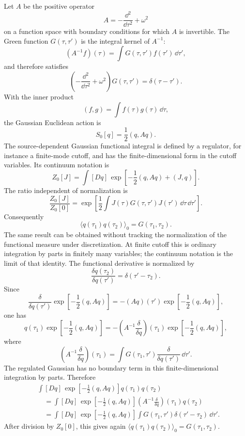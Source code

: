 Let \(A\) be the positive operator
\[
  A=-\frac{\dd^2}{\dd\tau^2}+\omega^2
\]
on a function space with boundary conditions for which \(A\) is invertible.
The Green function \(G(\tau,\tau')\) is the integral kernel of \(A^{-1}\):
\[
  (A^{-1}f)(\tau)
  =
  \int G(\tau,\tau')f(\tau')\,\dd\tau',
\]
and therefore satisfies
\[
  \left(
    -\frac{\dd^2}{\dd\tau^2}+\omega^2
  \right)G(\tau,\tau')
  =
  \delta(\tau-\tau').
\]
With the inner product
\[
  (f,g)=\int f(\tau)g(\tau)\,\dd\tau,
\]
the Gaussian Euclidean action is
\[
  S_0[q]=\frac12(q,Aq).
\]
The source-dependent Gaussian functional integral is defined by a regulator,
for instance a finite-mode cutoff, and has the finite-dimensional form in the
cutoff variables. Its continuum notation is
\[
  Z_0[J]
  =
  \int[Dq]\,
  \exp\left[
    -\frac12(q,Aq)+(J,q)
  \right].
\]
The ratio independent of normalization is
\[
  \frac{Z_0[J]}{Z_0[0]}
  =
  \exp\left[
    \frac12\int J(\tau)G(\tau,\tau')J(\tau')\,
    \dd\tau\,\dd\tau'
  \right].
\]
Consequently
\[
  \langle q(\tau_1)q(\tau_2)\rangle_0
  =
  G(\tau_1,\tau_2).
\]
The same result can be obtained without tracking the normalization of the
functional measure under discretization.  At finite cutoff this is ordinary
integration by parts in finitely many variables; the continuum notation is the
limit of that identity.  The functional derivative is normalized by
\[
  \frac{\delta q(\tau_2)}{\delta q(\tau')}=\delta(\tau'-\tau_2).
\]
Since
\[
  \frac{\delta}{\delta q(\tau')}
  \exp\left[-\frac12(q,Aq)\right]
  =
  -(Aq)(\tau')\exp\left[-\frac12(q,Aq)\right],
\]
one has
\[
  q(\tau_1)\exp\left[-\frac12(q,Aq)\right]
  =
  -
  \left(A^{-1}\frac{\delta}{\delta q}\right)(\tau_1)
  \exp\left[-\frac12(q,Aq)\right],
\]
where
\[
  \left(A^{-1}\frac{\delta}{\delta q}\right)(\tau_1)
  =
  \int G(\tau_1,\tau')\frac{\delta}{\delta q(\tau')}\,\dd\tau'.
\]
The regulated Gaussian has no boundary term in this finite-dimensional
integration by parts. Therefore
\[
\begin{aligned}
  &\int[Dq]\,\exp\left[-\frac12(q,Aq)\right]
    q(\tau_1)q(\tau_2)  \\
  &\quad =
  \int[Dq]\,\exp\left[-\frac12(q,Aq)\right]
  \left(A^{-1}\frac{\delta}{\delta q}\right)(\tau_1)q(\tau_2)  \\
  &\quad =
  \int[Dq]\,\exp\left[-\frac12(q,Aq)\right]
  \int G(\tau_1,\tau')\delta(\tau'-\tau_2)\,\dd\tau' .
\end{aligned}
\]
After division by \(Z_0[0]\), this gives again
\(\langle q(\tau_1)q(\tau_2)\rangle_0=G(\tau_1,\tau_2)\).

